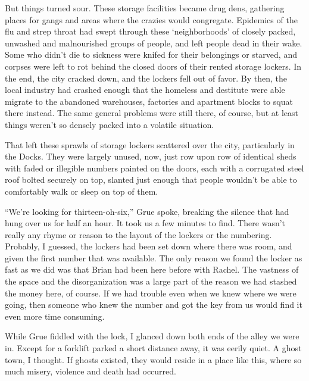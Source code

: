 But things turned sour.  These storage facilities became drug dens, gathering places for gangs and areas where the crazies would congregate.  Epidemics of the flu and strep throat had swept through these `neighborhoods' of closely packed, unwashed and malnourished groups of people, and left people dead in their wake.  Some who didn't die to sickness were knifed for their belongings or starved, and corpses were left to rot behind the closed doors of their rented storage lockers.  In the end, the city cracked down, and the lockers fell out of favor.  By then, the local industry had crashed enough that the homeless and destitute were able migrate to the abandoned warehouses, factories and apartment blocks to squat there instead.  The same general problems were still there, of course, but at least things weren't so densely packed into a volatile situation.



That left these sprawls of storage lockers scattered over the city, particularly in the Docks.  They were largely unused, now, just row upon row of identical sheds with faded or illegible numbers painted on the doors, each with a corrugated steel roof bolted securely on top, slanted just enough that people wouldn't be able to comfortably walk or sleep on top of them.



``We're looking for thirteen-oh-six,'' Grue spoke, breaking the silence that had hung over us for half an hour.  It took us a few minutes to find.  There wasn't really any rhyme or reason to the layout of the lockers or the numbering.  Probably, I guessed, the lockers had been set down where there was room, and given the first number that was available.  The only reason we found the locker as fast as we did was that Brian had been here before with Rachel.  The vastness of the space and the disorganization was a large part of the reason we had stashed the money here, of course.  If we had trouble even when we knew where we were going, then someone who knew the number and got the key from us would find it even more time consuming.



While Grue fiddled with the lock, I glanced down both ends of the alley we were in.  Except for a forklift parked a short distance away, it was eerily quiet.  A ghost town, I thought.  If ghosts existed, they would reside in a place like this, where so much misery, violence and death had occurred.




